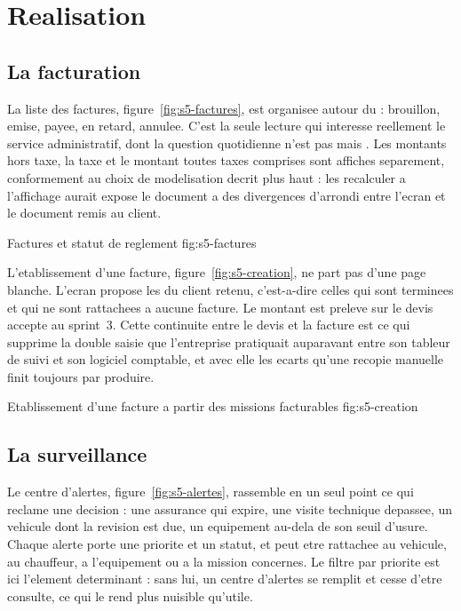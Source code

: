 \section{Realisation}

\subsection{La facturation}

La liste des factures, figure~\ref{fig:s5-factures}, est organisee autour
du  : brouillon, emise, payee, en retard,
annulee. C'est la seule lecture qui interesse reellement le service
administratif, dont la question quotidienne n'est pas  mais .
Les montants hors taxe, la taxe et le montant toutes taxes comprises sont
affiches separement, conformement au choix de modelisation decrit plus
haut : les recalculer a l'affichage aurait expose le document a des
divergences d'arrondi entre l'ecran et le document remis au client.

  {Factures et statut de reglement}
  {fig:s5-factures}

L'etablissement d'une facture, figure~\ref{fig:s5-creation}, ne part pas
d'une page blanche. L'ecran propose les 
du client retenu, c'est-a-dire celles qui sont terminees et qui ne sont
rattachees a aucune facture. Le montant est preleve sur le devis accepte
au sprint~3. Cette continuite entre le devis et la facture est ce qui
supprime la double saisie que l'entreprise pratiquait auparavant entre son
tableur de suivi et son logiciel comptable, et avec elle les ecarts qu'une
recopie manuelle finit toujours par produire.

  {Etablissement d'une facture a partir des missions facturables}
  {fig:s5-creation}

\subsection{La surveillance}

Le centre d'alertes, figure~\ref{fig:s5-alertes}, rassemble en un seul
point ce qui reclame une decision : une assurance qui expire, une visite
technique depassee, un vehicule dont la revision est due, un equipement
au-dela de son seuil d'usure. Chaque alerte porte une priorite et un
statut, et peut etre rattachee au vehicule, au chauffeur, a l'equipement
ou a la mission concernes. Le filtre par priorite est ici l'element
determinant : sans lui, un centre d'alertes se remplit et cesse d'etre
consulte, ce qui le rend plus nuisible qu'utile.

